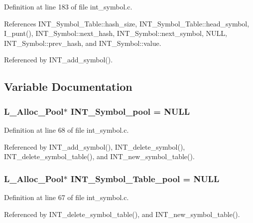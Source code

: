 Definition at line 183 of file int\_\-symbol.c.

References INT\_\-Symbol\_\-Table::hash\_\-size, INT\_\-Symbol\_\-Table::head\_\-symbol, I\_\-punt(), INT\_\-Symbol::next\_\-hash, INT\_\-Symbol::next\_\-symbol, NULL, INT\_\-Symbol::prev\_\-hash, and INT\_\-Symbol::value.

Referenced by INT\_\-add\_\-symbol().

\subsection{Variable Documentation}
\subsubsection{\setlength{\rightskip}{0pt plus 5cm}\bf{L\_\-Alloc\_\-Pool}$\ast$ \bf{INT\_\-Symbol\_\-pool} = NULL}\label{int__symbol_8c_69658acf7d49e607227757e653ac9290}




Definition at line 68 of file int\_\-symbol.c.

Referenced by INT\_\-add\_\-symbol(), INT\_\-delete\_\-symbol(), INT\_\-delete\_\-symbol\_\-table(), and INT\_\-new\_\-symbol\_\-table().
\subsubsection{\setlength{\rightskip}{0pt plus 5cm}\bf{L\_\-Alloc\_\-Pool}$\ast$ \bf{INT\_\-Symbol\_\-Table\_\-pool} = NULL}\label{int__symbol_8c_4689b5a81f564b3837a8fe101a4f6544}




Definition at line 67 of file int\_\-symbol.c.

Referenced by INT\_\-delete\_\-symbol\_\-table(), and INT\_\-new\_\-symbol\_\-table().